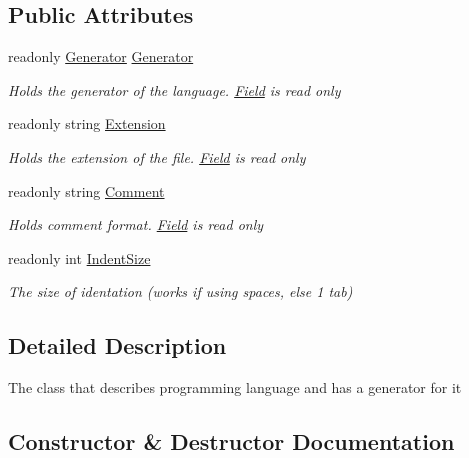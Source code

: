 \subsection*{Public Attributes}
\begin{DoxyCompactItemize}
\item 
readonly \mbox{\hyperlink{classCodeGen_1_1generators_1_1Generator}{Generator}} \mbox{\hyperlink{structCodeGen_1_1generators_1_1Languange_a25fb0a47247497581d2d0560d0db66d8}{Generator}}
\begin{DoxyCompactList}\small\item\em Holds the generator of the language. \mbox{\hyperlink{classCodeGen_1_1generators_1_1Field}{Field}} is read only \end{DoxyCompactList}\item 
readonly string \mbox{\hyperlink{structCodeGen_1_1generators_1_1Languange_af00eae192536b05d637d0b81954202c7}{Extension}}
\begin{DoxyCompactList}\small\item\em Holds the extension of the file. \mbox{\hyperlink{classCodeGen_1_1generators_1_1Field}{Field}} is read only \end{DoxyCompactList}\item 
readonly string \mbox{\hyperlink{structCodeGen_1_1generators_1_1Languange_aa63aaf377bcac5ca06c14304701c3493}{Comment}}
\begin{DoxyCompactList}\small\item\em Holds comment format. \mbox{\hyperlink{classCodeGen_1_1generators_1_1Field}{Field}} is read only \end{DoxyCompactList}\item 
readonly int \mbox{\hyperlink{structCodeGen_1_1generators_1_1Languange_a3337b97358faf06c1e633e80f71cf2b4}{Indent\+Size}}
\begin{DoxyCompactList}\small\item\em The size of identation (works if using spaces, else 1 tab) \end{DoxyCompactList}\end{DoxyCompactItemize}


\subsection{Detailed Description}
The class that describes programming language and has a generator for it 



\subsection{Constructor \& Destructor Documentation}
\mbox{\label{structCodeGen_1_1generators_1_1Languange_a89fa98041473b18a7df845e14edcba07}} 
